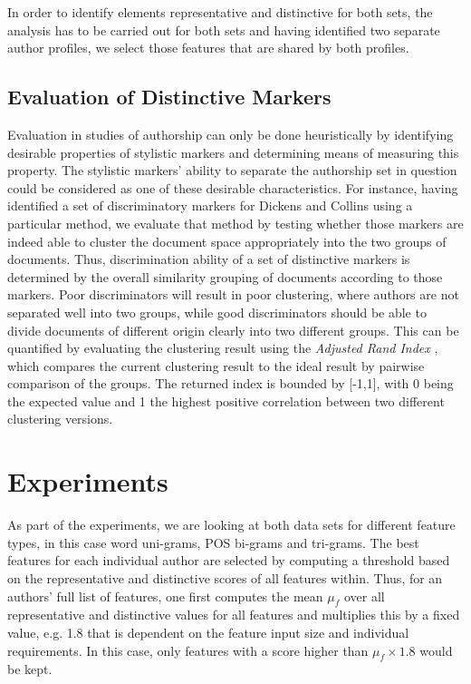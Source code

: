 \documentclass[a4paper,10pt,twoside,fleqn]{article}
\begin{document}
In order to identify elements representative and distinctive for both sets,
the analysis has to be carried out for both sets and having identified
two separate author profiles, we select those features that are shared
by both profiles.

\subsection{Evaluation of Distinctive Markers} \label{sec:evaluation}
Evaluation in studies of authorship can only be done heuristically
by identifying desirable properties of stylistic markers and
determining means of measuring this property. 
The stylistic markers' ability to separate the authorship set in 
question could be considered as one of these desirable characteristics. 
For instance, having identified a set of discriminatory markers
for Dickens and Collins using a particular method, we evaluate 
that method by testing whether those markers are indeed able to 
cluster the document space appropriately into the two groups of
documents. 
Thus, discrimination ability of a set of distinctive markers
is determined by the overall similarity grouping of documents 
according to those markers. 
Poor discriminators will result in poor clustering, where
authors are not separated well into two groups, while 
good discriminators should be able to divide documents of 
different origin clearly into two different groups. 
This can be quantified by evaluating the clustering result
using the \emph{Adjusted Rand Index} \cite{hubert1985comparing},
which compares the current clustering result to the ideal 
result by pairwise comparison of the groups. 
The returned index is bounded by [-1,1], with 0 being the 
expected value and 1 the highest positive correlation 
between two different clustering versions. 

\section{Experiments}\label{sec:experiments}
As part of the experiments, we are looking at both data sets
for different feature types, in this case word uni-grams,
POS bi-grams and tri-grams. 
The best features for each individual author are selected by 
computing a threshold based on the representative and distinctive
scores of all features within. 
Thus, for an authors' full list of features, one first computes 
the mean $\mu_f$ over all representative and distinctive values 
for all features and multiplies this by a fixed value, e.g. 1.8
that is dependent on the feature input size and individual
requirements. In this case, only features with a score higher than
$\mu_f \times 1.8$ would be kept. 
\end{document}
